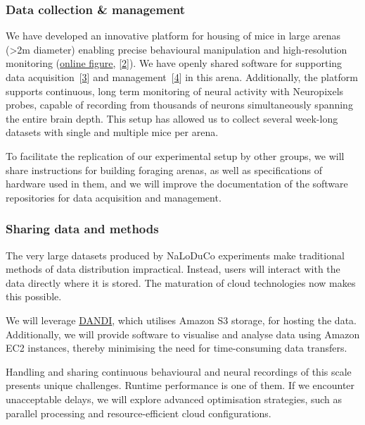 \subsubsection{Data collection \& management}

We have developed an innovative platform for housing of mice in large arenas
(\textgreater 2m diameter) enabling precise behavioural manipulation and
high-resolution monitoring
(\href{https://www.gatsby.ucl.ac.uk/~rapela/bbsrc\_nsfbio/figures/foragingArena.png}{online
figure},
[\href{https://www.abstractsonline.com/pp8/?_gl=1*it0gi6*_gcl_au*MTUyNDE0NDQwLjE3Mjc2OTgyODM.*_ga*MTUxNDI2NDg5LjE3Mjc2OTgyODM.*_ga_T09K3Q2WDN*MTcyOTUwNDUzNy4yLjEuMTcyOTUwNDY3Ny41NC4wLjA.#!/20433/presentation/22271}{2}]).
%
We have openly shared software for supporting data
acquisition~[\href{https://github.com/SainsburyWellcomeCentre/aeon_acquisition}{3}]
and
management~[\href{https://github.com/SainsburyWellcomeCentre/aeon_mecha}{4}] in this
arena.
%
Additionally, the platform supports continuous, long term monitoring of neural
activity with Neuropixels probes, capable of recording from thousands of
neurons simultaneously spanning the entire brain depth.
%
This setup has allowed us to collect several week-long datasets with single and
multiple mice per arena.

To facilitate the replication of our experimental setup by other groups, we
will share instructions for building foraging arenas, as well as specifications
of hardware used in them,
%
and we will improve the documentation of the software repositories for data
acquisition and management.

\subsubsection{Sharing data and methods}

The very large datasets produced by NaLoDuCo experiments make traditional
methods of data distribution impractical. Instead, users will interact with the
data directly where it is stored. The maturation of cloud technologies now
makes this possible.

We will leverage \href{https://www.dandiarchive.org/}{DANDI}, which utilises
Amazon S3 storage, for hosting the data. Additionally, we will provide software
to visualise and analyse data using Amazon EC2 instances, thereby minimising
the need for time-consuming data transfers.

Handling and sharing continuous behavioural and neural recordings of this scale
presents unique challenges. Runtime performance is one of them. If we
encounter unacceptable delays, we will explore advanced optimisation
strategies, such as parallel processing and resource-efficient cloud
configurations.

